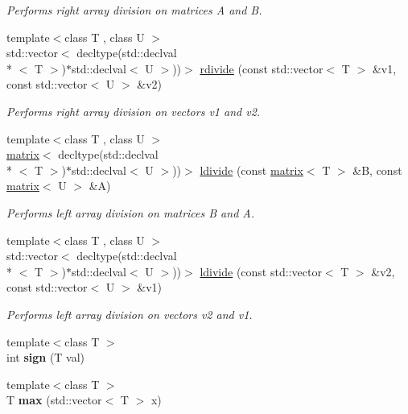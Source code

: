 \begin{DoxyCompactItemize}
\begin{DoxyCompactList}\small\item\em Performs right array division on matrices A and B. \end{DoxyCompactList}\item 
{\footnotesize template$<$class T , class U $>$ }\\std\-::vector$<$ decltype(std\-::declval\\*
$<$ T $>$)$\ast$std\-::declval$<$ U $>$))$>$ \hyperlink{namespacekeycpp_af234cd07a4e1d649629a6b83dbe113ff}{rdivide} (const std\-::vector$<$ T $>$ \&v1, const std\-::vector$<$ U $>$ \&v2)
\begin{DoxyCompactList}\small\item\em Performs right array division on vectors v1 and v2. \end{DoxyCompactList}\item 
{\footnotesize template$<$class T , class U $>$ }\\\hyperlink{classkeycpp_1_1matrix}{matrix}$<$ decltype(std\-::declval\\*
$<$ T $>$)$\ast$std\-::declval$<$ U $>$))$>$ \hyperlink{namespacekeycpp_ac57d32902cba2c399475015235aeccec}{ldivide} (const \hyperlink{classkeycpp_1_1matrix}{matrix}$<$ T $>$ \&B, const \hyperlink{classkeycpp_1_1matrix}{matrix}$<$ U $>$ \&A)
\begin{DoxyCompactList}\small\item\em Performs left array division on matrices B and A. \end{DoxyCompactList}\item 
{\footnotesize template$<$class T , class U $>$ }\\std\-::vector$<$ decltype(std\-::declval\\*
$<$ T $>$)$\ast$std\-::declval$<$ U $>$))$>$ \hyperlink{namespacekeycpp_a7a86bc7e25833cdf9266c038a4edb0ea}{ldivide} (const std\-::vector$<$ T $>$ \&v2, const std\-::vector$<$ U $>$ \&v1)
\begin{DoxyCompactList}\small\item\em Performs left array division on vectors v2 and v1. \end{DoxyCompactList}\item 
\hypertarget{namespacekeycpp_a8f1cd159623e23abeedd26d34fc500d9}{{\footnotesize template$<$class T $>$ }\\int {\bfseries sign} (T val)}\label{namespacekeycpp_a8f1cd159623e23abeedd26d34fc500d9}

\item 
\hypertarget{namespacekeycpp_abebb8d8939a33f6c3cb00be9278114c6}{{\footnotesize template$<$class T $>$ }\\T {\bfseries max} (std\-::vector$<$ T $>$ x)}\label{namespacekeycpp_abebb8d8939a33f6c3cb00be9278114c6}


\end{DoxyCompactItemize}
